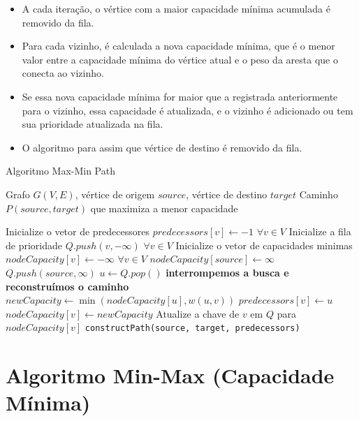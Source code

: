 \documentclass[12pt]{article}
\begin{document}
\begin{itemize}
    \item A cada iteração, o vértice com a maior capacidade mínima acumulada é removido da fila.
    \item Para cada vizinho, é calculada a nova capacidade mínima, que é o menor valor entre a capacidade mínima do vértice atual e o peso da aresta que o conecta ao vizinho.
    \item Se essa nova capacidade mínima for maior que a registrada anteriormente para o vizinho, essa capacidade é atualizada, e o vizinho é adicionado ou tem sua prioridade atualizada na fila.
    \item O algoritmo para assim que vértice de destino é removido da fila.
\end{itemize}

\begin{algorithm}
\caption{Algoritmo Max-Min Path}

\begin{algorithmic}[1]
\REQUIRE Grafo \( G(V, E) \), vértice de origem \( source \), vértice de destino \( target \)
\ENSURE Caminho \( P(source, target) \) que maximiza a menor capacidade

\STATE Inicialize o vetor de predecessores \( predecessors[v] \leftarrow -1 \) \(\forall v \in V\)
\STATE Inicialize a fila de prioridade \( Q.push(v, -\infty ) \) \(\forall v \in V\)
\STATE Inicialize o vetor de capacidades minimas \( nodeCapacity[v] \leftarrow -\infty\) \(\forall v \in V\)
\STATE \( nodeCapacity[source] \leftarrow \infty \)
\STATE \( Q.push(source, \infty) \)
    \STATE \( u \leftarrow Q.pop() \) 
        \STATE \textbf{interrompemos a busca e reconstruímos o caminho}
    \ENDIF
        \STATE \( newCapacity \leftarrow \min(nodeCapacity[u], w(u, v)) \)
            \STATE \( predecessors[v] \leftarrow u \)
            \STATE \( nodeCapacity[v] \leftarrow newCapacity \)
            \STATE Atualize a chave de \( v \) em \( Q \) para \( nodeCapacity[v] \)
        \ENDIF
    \ENDFOR
\ENDWHILE
\RETURN \texttt{constructPath(source, target, predecessors)}
\end{algorithmic}
\end{algorithm}

\newpage

\section{Algoritmo Min-Max (Capacidade Mínima)}
\end{document}
